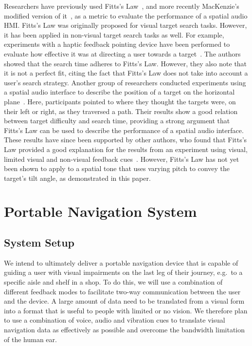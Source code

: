 \documentclass[sigconf, review=true, screen=true, anonymous=true]{acmart}
\begin{document}
Researchers have previously used Fitts's Law~\cite{fitts1954information}, and more recently MacKenzie's modified version of it~\cite{mackenzie1992fitts}, as a metric to evaluate the performance of a spatial audio HMI\@.
Fitts's Law was originally proposed for visual target search tasks.
However, it has been applied in non-visual target search tasks as well.
For example, experiments with a haptic feedback pointing device have been performed to evaluate how effective it was at directing a user towards a target~\cite{ahmaniemi2009augmented}.
The authors showed that the search time adheres to Fitts's Law.
However, they also note that it is not a perfect fit, citing the fact that Fitts's Law does not take into account a user's search strategy.
Another group of researchers conducted experiments using a spatial audio interface to describe the position of a target on the horizontal plane~\cite{marentakis2006effects}.
Here, participants pointed to where they thought the targets were, on their left or right, as they traversed a path.
Their results show a good relation between target difficulty and search time, providing a strong argument that Fitts's Law can be used to describe the performance of a spatial audio interface.
These results have since been supported by other authors, who found that Fitts's Law provided a good explanation for the results from an experiment using visual, limited visual and non-visual feedback cues~\cite{wu2010fitts}.
However, Fitts's Law has not yet been shown to apply to a spatial tone that uses varying pitch to convey the target's tilt angle, as demonstrated in this paper.

\section{Portable Navigation System}\label{sec:portable-navigation}

\subsection{System Setup}

We intend to ultimately deliver a portable navigation device that is capable of guiding a user with visual impairments on the last leg of their journey, e.g.\ to a specific aisle and shelf in a shop.
To do this, we will use a combination of different feedback modes to facilitate two-way communication between the user and the device.
A large amount of data need to be translated from a visual form into a format that is useful to people with limited or no vision.
We therefore plan to use a combination of voice, audio and vibration cues to translate visual navigation data as effectively as possible and overcome the bandwidth limitation of the human ear. 
\end{document}
